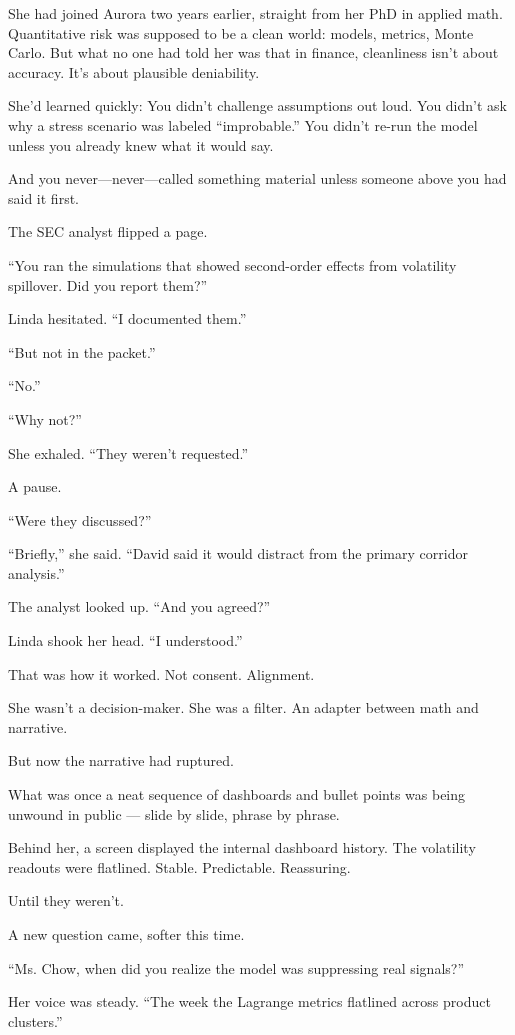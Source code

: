She had joined Aurora two years earlier, straight from her PhD in applied math.
Quantitative risk was supposed to be a clean world: models, metrics, Monte Carlo.
But what no one had told her was that in finance, cleanliness isn’t about accuracy.
It’s about plausible deniability.

She’d learned quickly:
You didn’t challenge assumptions out loud.
You didn’t ask why a stress scenario was labeled “improbable.”
You didn’t re-run the model unless you already knew what it would say.

And you never—never—called something material unless someone above you had said it first.

The SEC analyst flipped a page.

“You ran the simulations that showed second-order effects from volatility spillover. Did you report them?”

Linda hesitated.
“I documented them.”

“But not in the packet.”

“No.”

“Why not?”

She exhaled.
“They weren’t requested.”

A pause.

“Were they discussed?”

“Briefly,” she said. “David said it would distract from the primary corridor analysis.”

The analyst looked up. “And you agreed?”

Linda shook her head.
“I understood.”

That was how it worked.
Not consent. Alignment.

She wasn’t a decision-maker.
She was a filter.
An adapter between math and narrative.

But now the narrative had ruptured.

What was once a neat sequence of dashboards and bullet points was being unwound in public — slide by slide, phrase by phrase.

Behind her, a screen displayed the internal dashboard history.
The volatility readouts were flatlined.
Stable. Predictable.
Reassuring.

Until they weren’t.

A new question came, softer this time.

“Ms. Chow, when did you realize the model was suppressing real signals?”

Her voice was steady.
“The week the Lagrange metrics flatlined across product clusters.”

